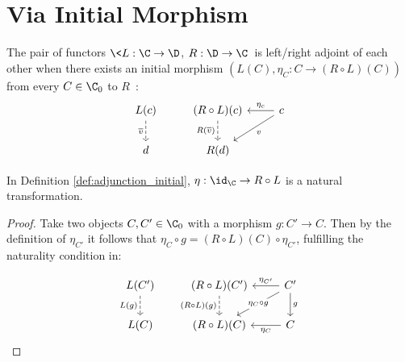 \section{Via Initial Morphism}

\begin{definition}[Adjunction]\label{def:adjunction_initial}

  The pair of functors $\<L: \C\to \D$, $R: \D\to \C\>$ is left/right adjoint of
  each other when there exists an initial morphism $(L(C), \eta_C:C\to (R\circ
  L)(C))$ from every $C\in \C_0$ to
  $R$~\parencite[p.~208]{awodey:category_theory}:
  \[\begin{tikzcd}[ampersand replacement=\&]
    {L(c)} \& {(R\circ L)(c)} \& c \\
    d \& {R(d)}
    \arrow["{\overline{v}}"', dashed, from=1-1, to=2-1]
    \arrow["{R(\overline{v})}"', dashed, from=1-2, to=2-2]
    \arrow["v", from=1-3, to=2-2]
    \arrow["{\eta_c}"', from=1-3, to=1-2]
  \end{tikzcd}\]
\end{definition}

\begin{theorem}
  In Definition \ref{def:adjunction_initial}, $\eta:\id_\C \to R\circ L$ is a
  natural transformation.

  \begin{proof}
    Take two objects $C,C'\in \C_0$ with a morphism $g:C'\to C$. Then by the
    definition of $\eta_{C'}$ it follows that $\eta_C\circ g = (R\circ
    L)(C)\circ \eta_{C'}$, fulfilling the naturality condition in:

    \[\begin{tikzcd}[ampersand replacement=\&]
      {L(C')} \& {(R\circ L)(C')} \& {C'} \\
      {L(C)} \& {(R\circ L)(C)} \& C
      \arrow["{\eta_C}", from=2-3, to=2-2]
      \arrow["{\eta_{C'}}"', from=1-3, to=1-2]
      \arrow["g", from=1-3, to=2-3]
      \arrow["{(R\circ L)(g)}"', dashed, from=1-2, to=2-2]
      \arrow["{L(g)}"', dashed, from=1-1, to=2-1]
      \arrow["{\eta_C\circ g}"{description}, from=1-3, to=2-2]
    \end{tikzcd}\]
  \end{proof}
  \vspace{-\baselineskip}
\end{theorem}

